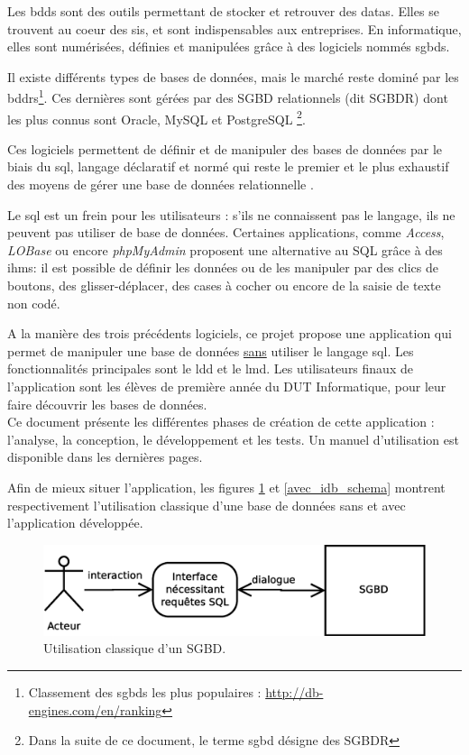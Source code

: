 Les \glspl{bdd} sont des outils permettant de stocker et retrouver des \glspl{data}. 
Elles se trouvent au coeur des \glspl{si}, et sont indispensables aux entreprises.
En informatique, elles sont numérisées, définies et manipulées grâce à des logiciels nommés \glspl{sgbd}.

Il existe différents types de bases de données, mais le marché reste dominé par les \glspl{bddr}\footnote{\label{part_de_marché_relationnel}
Classement des \glspl{sgbd} les plus populaires : \url{http://db-engines.com/en/ranking}}.
Ces dernières sont gérées par des SGBD relationnels (dit SGBDR) 
dont les plus connus sont Oracle, MySQL et PostgreSQL
\footnote{Dans la suite de ce document, le terme \gls{sgbd} désigne des SGBDR}.

Ces logiciels permettent de définir et de manipuler des bases de données par le biais du \gls{sql}, 
langage déclaratif et normé qui reste le premier et le plus exhaustif des moyens de gérer une base de données relationnelle .

Le \gls{sql} est un frein pour les utilisateurs : s'ils ne connaissent pas le langage, ils ne peuvent pas utiliser de base de données.
Certaines applications, comme \textit{Access}, \textit{LOBase} ou encore \textit{phpMyAdmin} proposent une alternative au SQL grâce à des 
\glspl{ihm}: il est possible de définir les données ou de les manipuler par des clics de boutons, des glisser-déplacer, des cases à cocher ou encore de la saisie
de texte non codé. 

A la manière des trois précédents logiciels, ce projet propose une application qui permet de manipuler une base de données \underline{sans} utiliser le langage \gls{sql}.
Les fonctionnalités principales sont le \gls{ldd} et le \gls{lmd}.
Les utilisateurs finaux de l'application sont les élèves de première année du DUT Informatique, pour leur faire découvrir les bases de données.\\

Ce document présente les différentes phases de création de cette application : l'analyse, la conception, le développement et les tests.
Un manuel d'utilisation est disponible dans les dernières pages.

Afin de mieux situer l'application, les figures \ref{sans_idb_schema} et \ref{avec_idb_schema} montrent respectivement l'utilisation classique d'une base de données sans et avec l'application développée.

\begin{figure}[!h]
  \centering
  \includegraphics[width=14cm]{images/sans_idb.eps}
  \caption{Utilisation classique d'un SGBD.}
  \label{sans_idb_schema}
\end{figure}

